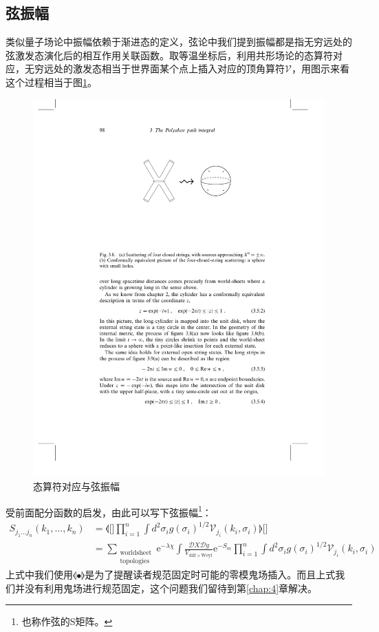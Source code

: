 \subsection{弦振幅}
类似量子场论中振幅依赖于渐进态的定义，弦论中我们提到振幅都是指无穷远处的弦激发态演化后的相互作用关联函数。取等温坐标后，利用共形场论的态算符对应，无穷远处的激发态相当于世界面某个点上插入对应的顶角算符$\mathscr{V}$，用图示来看这个过程相当于图\ref{fig:1}。
\begin{figure}[htbp]
	\centering
	\includegraphics{figs/fig1.pdf}
	\caption{态算符对应与弦振幅}
	\label{fig:1}
\end{figure}
受前面配分函数的启发，由此可以写下弦振幅\footnote{也称作弦的S矩阵。}：
\begin{equation}
	\begin{aligned}
		S_{j_1...j_n}(k_1,\ldots,k_n)&=\llangle[\Big]\prod_{i=1}^n\int d^2\sigma_ig(\sigma_i)^{1/2}\mathscr{V}_{j_i}(k_i,\sigma_i)\rrangle[\Big]
		\\&=\sum_{\substack{\text{worldsheet}\\\text{topologies}}}\mathrm{e}^{-\lambda \chi}\int\frac{\mathcal{D}X\mathcal{D}g}{V_{\mathrm{diff}\times\mathrm{Weyl}}}\mathrm{e}^{-S_m}\prod_{i=1}^n\int d^2\sigma_ig(\sigma_i)^{1/2}\mathscr{V}_{j_i}(k_i,\sigma_i)
	\end{aligned}
\end{equation}
上式中我们使用$\llangle\bullet\rrangle$是为了提醒读者规范固定时可能的零模鬼场插入。而且上式我们并没有利用鬼场进行规范固定，这个问题我们留待到第\ref{chap:4}章解决。
